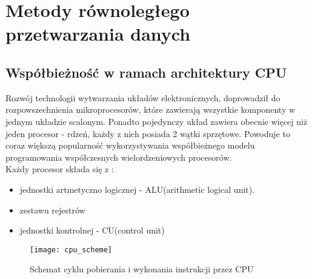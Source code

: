 \documentclass[document.tex]{subfiles}
\begin{document}
\chapter{Metody równoległego przetwarzania danych}

\section{Współbieżność w ramach architektury CPU}
\indent Rozwój technologii wytwarzania układów elektronicznych, doprowadził do 
rozpowszechnienia mikroprocesorów, które zawierają wszystkie komponenty w jednym
układzie scalonym. Ponadto pojedynczy układ zawiera obecnie więcej niż jeden procesor - rdzeń, każdy z nich posiada 2
wątki sprzętowe. Powoduje to coraz większą popularność wykorzystywania współbieżnego modelu programowania współczesnych wielordzeniowych procesorów.\cite{OS_Stallings}
\cite{Computer_Architecture_Patterson_Hennesy}
\\
\indent Każdy procesor składa się z :
\begin{itemize}
\item jednostki artmetyczno logicznej - ALU(arithmetic logical unit).
\item zestawu rejestrów
\item jednostki kontrolnej - CU(control unit)
\end{itemize}

\begin{figure}[h]
\texttt{[image: cpu\_scheme]}
\caption{Schemat cyklu pobierania i wykonania instrukcji przez CPU \protect\cite{OS_Stallings}}
\label{fig:cpu_scheme}
\end{figure}
\end{document}
